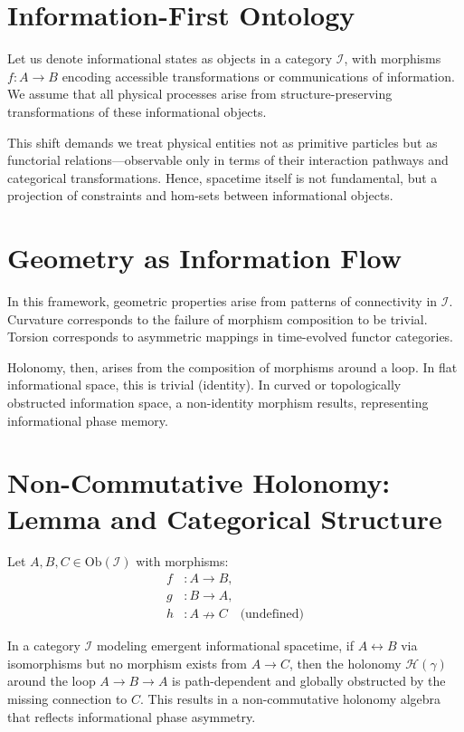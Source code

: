 \documentclass[11pt]{article}
\begin{document}
\section{Information-First Ontology}

Let us denote informational states as objects in a category \( \mathcal{I} \), with morphisms \( f: A \to B \) encoding accessible transformations or communications of information. We assume that all physical processes arise from structure-preserving transformations of these informational objects.

This shift demands we treat physical entities not as primitive particles but as functorial relations---observable only in terms of their interaction pathways and categorical transformations. Hence, spacetime itself is not fundamental, but a projection of constraints and hom-sets between informational objects.

\section{Geometry as Information Flow}

In this framework, geometric properties arise from patterns of connectivity in \( \mathcal{I} \). Curvature corresponds to the failure of morphism composition to be trivial. Torsion corresponds to asymmetric mappings in time-evolved functor categories.

Holonomy, then, arises from the composition of morphisms around a loop. In flat informational space, this is trivial (identity). In curved or topologically obstructed information space, a non-identity morphism results, representing informational phase memory.

\section{Non-Commutative Holonomy: Lemma and Categorical Structure}

Let \( A, B, C \in \text{Ob}(\mathcal{I}) \) with morphisms:
\begin{align*}
  f &: A \to B, \\
  g &: B \to A, \\
  h &: A \nrightarrow C \quad \text{(undefined)}
\end{align*}

\begin{lemma}
In a category \( \mathcal{I} \) modeling emergent informational spacetime, if \( A \leftrightarrow B \) via isomorphisms but no morphism exists from \( A \to C \), then the holonomy \( \mathcal{H}(\gamma) \) around the loop \( A \to B \to A \) is path-dependent and globally obstructed by the missing connection to \( C \). This results in a non-commutative holonomy algebra that reflects informational phase asymmetry.
\end{lemma}
\end{document}
